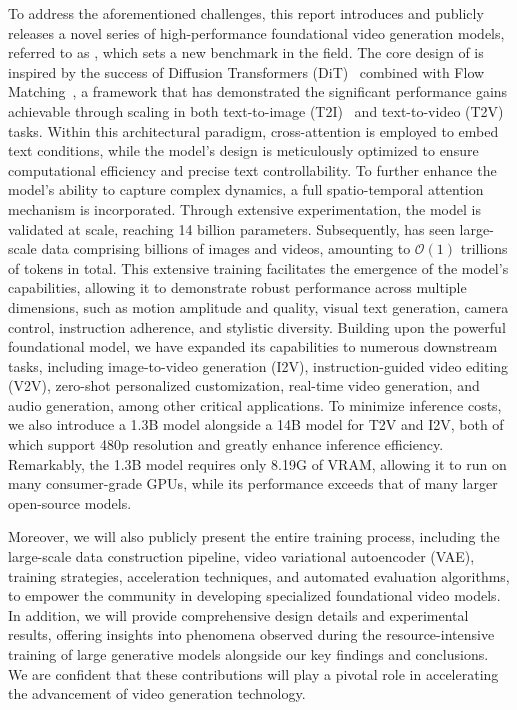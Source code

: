 To address the aforementioned challenges, this report introduces and publicly releases a novel series of high-performance foundational video generation models, referred to as \method, which sets a new benchmark in the field.
%
The core design of \method is inspired by the success of Diffusion Transformers (DiT)~\citep{dit} combined with Flow Matching~\citep{flow-matching}, a framework that has demonstrated the significant performance gains achievable through scaling in both text-to-image (T2I)~\citep{esser2024sd3} and text-to-video (T2V)~\citep{kong2024hunyuanvideo} tasks.
%
Within this architectural paradigm, cross-attention is employed to embed text conditions, while the model's design is meticulously optimized to ensure computational efficiency and precise text controllability. 
%
To further enhance the model's ability to capture complex dynamics, a full spatio-temporal attention mechanism is incorporated.
%
Through extensive experimentation, the model is validated at scale, reaching 14 billion parameters.
%
Subsequently, \method has seen large-scale data comprising billions of images and videos, amounting to $\mathcal{O}(1)$ trillions of tokens in total.
%
This extensive training facilitates the emergence of the model's capabilities, allowing it to demonstrate robust performance across multiple dimensions, such as motion amplitude and quality, visual text generation, camera control, instruction adherence, and stylistic diversity.
%
Building upon the powerful foundational model, we have expanded its capabilities to numerous downstream tasks, including image-to-video generation (I2V), instruction-guided video editing (V2V), zero-shot personalized customization, real-time video generation, and audio generation, among other critical applications.
%
To minimize inference costs, we also introduce a 1.3B model alongside a 14B model for T2V and I2V, both of which support 480p resolution and greatly enhance inference efficiency. 
%
Remarkably, the 1.3B model requires only 8.19G of VRAM, allowing it to run on many consumer-grade GPUs, while its performance exceeds that of many larger open-source models.


Moreover, we will also publicly present the entire training process, including the large-scale data construction pipeline, video variational autoencoder (VAE), training strategies, acceleration techniques, and automated evaluation algorithms, to empower the community in developing specialized foundational video models.
%
In addition, we will provide comprehensive design details and experimental results, offering insights into phenomena observed during the resource-intensive training of large generative models alongside our key findings and conclusions.
%
We are confident that these contributions will play a pivotal role in accelerating the advancement of video generation technology.


